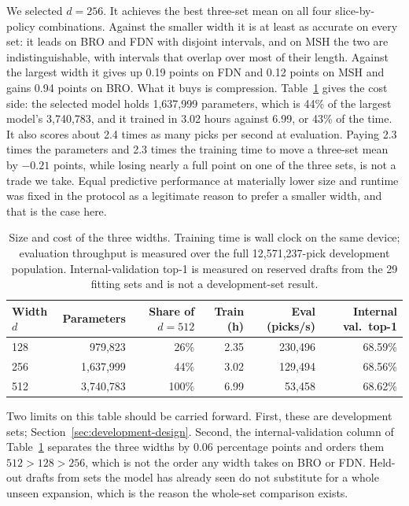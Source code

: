 \documentclass[11pt]{article}
\numberwithin{equation}{section}
\begin{document}
We selected $d=256$. It achieves the best three-set mean on all four
slice-by-policy combinations. Against the smaller width it is at least as
accurate on every set: it leads on BRO and FDN with disjoint intervals, and on
MSH the two are indistinguishable, with intervals that overlap over most of
their length. Against the largest width it gives up 0.19 points on FDN and 0.12
points on MSH and gains 0.94 points on BRO. What it buys is compression.
Table~\ref{tab:width-efficiency} gives the cost side: the selected model holds
1,637,999 parameters, which is 44\% of the largest model's 3,740,783, and it
trained in 3.02 hours against 6.99, or 43\% of the time. It also scores about
2.4 times as many picks per second at evaluation. Paying 2.3 times the
parameters and 2.3 times the training time to move a three-set mean by
$-0.21$ points, while losing nearly a full point on one of the three sets, is
not a trade we take. Equal predictive performance at materially lower size and
runtime was fixed in the protocol as a legitimate reason to prefer a smaller
width, and that is the case here.

\begin{table}[tb]
\centering
\caption{Size and cost of the three widths. Training time is wall clock on the
same device; evaluation throughput is measured over the full 12,571,237-pick
development population. Internal-validation top-1 is measured on reserved drafts
from the 29 fitting sets and is not a development-set result.}
\label{tab:width-efficiency}
{\small
\setlength{\tabcolsep}{7pt}
\begin{tabular}{lrrrrr}
\toprule
Width $d$ & Parameters & Share of $d{=}512$ & Train (h) & Eval (picks/s) &
Internal val.\ top-1 \\
\midrule
128 & 979,823 & 26\% & 2.35 & 230,496 & 68.59\% \\
256 & 1,637,999 & 44\% & 3.02 & 129,494 & 68.56\% \\
512 & 3,740,783 & 100\% & 6.99 & 53,458 & 68.62\% \\
\bottomrule
\end{tabular}
}
\end{table}

Two limits on this table should be carried forward. First, these are development
sets; Section~\ref{sec:development-design}. Second, the internal-validation column of
Table~\ref{tab:width-efficiency} separates the three widths by 0.06 percentage
points and orders them $512>128>256$, which is not the order any width takes on
BRO or FDN. Held-out drafts from sets the model has already seen do not
substitute for a whole unseen expansion, which is the reason the whole-set
comparison exists.
\end{document}
